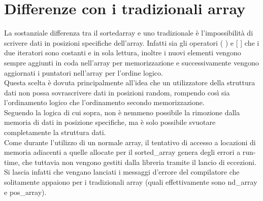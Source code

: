 \documentclass[11pt]{article}
\begin{document}
\section*{Differenze con i tradizionali array}
La sostanziale differenza tra il sortedarray e uno tradizionale è l'impossibilità di scrivere dati in posizioni specifiche dell'array. Infatti sia gli operatori ( ) e [ ] che i due iteratori sono costanti e in sola lettura, inoltre i nuovi elementi vengono sempre aggiunti in coda nell'array per memorizzazione e successivamente vengono aggiornati i puntatori nell'array per l'ordine logico.\\
Questa scelta è dovuta principalmente all'idea che un utilizzatore della struttura dati non possa sovrascrivere dati in posizioni random, rompendo così sia l'ordinamento logico che l'ordinamento secondo memorizzazione.\\
Seguendo la logica di cui sopra, non è nemmeno possibile la rimozione dalla memoria di dati in posizione specifiche, ma è solo possibile svuotare completamente la struttura dati.\\
Come durante l'utilizzo di un normale array, il tentativo di accesso a locazioni di memoria adiacenti a quelle 
allocate per il sorted\_array genera degli errori a run-time, che tuttavia non vengono gestiti dalla libreria 
tramite il lancio di eccezioni. Si lascia infatti che vengano lanciati i messaggi d'errore del compilatore che 
solitamente appaiono per i tradizionali array (quali effettivamente sono nd\_array e pos\_array).
\end{document}
